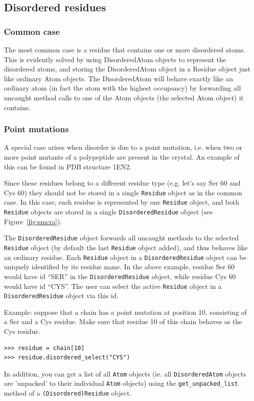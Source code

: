 \subsection{Disordered residues}

\subsubsection*{Common case}

The most common case is a residue that contains one or more disordered atoms.
This is evidently solved by using DisorderedAtom objects to represent the disordered
atoms, and storing the DisorderedAtom object in a Residue object just like ordinary
Atom objects. The DisorderedAtom will behave exactly like an ordinary atom (in
fact the atom with the highest occupancy) by forwarding all uncaught method
calls to one of the Atom objects (the selected Atom object) it contains.

\subsubsection*{Point mutations}
\label{sec:point_mutations}

A special case arises when disorder is due to a point mutation, i.e. when two
or more point mutants of a polypeptide are present in the crystal. An example
of this can be found in PDB structure 1EN2.

Since these residues belong to a different residue type (e.g. let's
say Ser 60 and Cys 60) they should not be stored in a single \texttt{Residue}
object as in the common case. In this case, each residue is represented
by one \texttt{Residue} object, and both \texttt{Residue} objects
are stored in a single \texttt{Disordered\-Residue} object (see
Figure~\ref{fig:smcra}).

The \texttt{Dis\-ordered\-Residue} object forwards all un\-caught methods to
the selected \texttt{Residue} object (by default the last \texttt{Residue}
object added), and thus behaves like an ordinary residue. Each
\texttt{Residue} object in a \texttt{Disordered\-Residue} object can be
uniquely identified by its residue name. In the above example, residue Ser 60
would have id ``SER'' in the \texttt{Disordered\-Residue} object, while
residue Cys 60 would have id ``CYS''. The user can select the active
\texttt{Residue} object in a \texttt{Disordered\-Residue} object via this id.

Example: suppose that a chain has a point mutation at position 10,
consisting of a Ser and a Cys residue. Make sure that residue 10 of
this chain behaves as the Cys residue.
\begin{verbatim}
>>> residue = chain[10]
>>> residue.disordered_select("CYS")
\end{verbatim}
In addition, you can get a list of all \texttt{Atom} objects (ie.
all \texttt{DisorderedAtom} objects are 'unpacked' to their individual
\texttt{Atom} objects) using the \texttt{get\_unpacked\_list} method
of a \texttt{(Disordered)\-Residue} object.

